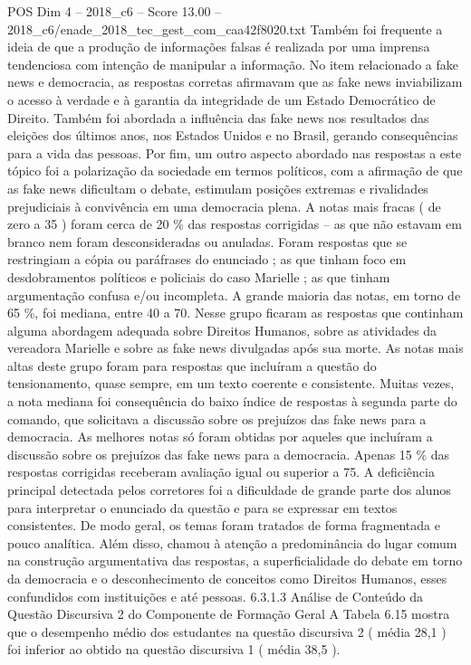 \begin{textsample}{POS Dim 4 – 2018\_c6 – Score 13.00 – 2018\_c6/enade\_2018\_tec\_gest\_com\_caa42f8020.txt}
Também foi frequente a ideia de que a produção de informações falsas é realizada por uma imprensa tendenciosa com intenção de manipular a informação.
No item relacionado a fake news e democracia, as respostas corretas afirmavam que as fake news inviabilizam o acesso à verdade e à garantia da integridade de um Estado Democrático de Direito.
Também foi abordada a influência das fake news nos resultados das eleições dos últimos anos, nos Estados Unidos e no Brasil, gerando consequências para a vida das pessoas.
Por fim, um outro aspecto abordado nas respostas a este tópico foi a polarização da sociedade em termos políticos, com a afirmação de que as fake news dificultam o debate, estimulam posições extremas e rivalidades prejudiciais à convivência em uma democracia plena.
A notas mais fracas ( de zero a 35 ) foram cerca de 20 \% das respostas corrigidas – as que não estavam em branco nem foram desconsideradas ou anuladas.
Foram respostas que se restringiam a cópia ou paráfrases do enunciado ; as que tinham foco em desdobramentos políticos e policiais do caso Marielle ; as que tinham argumentação confusa e/ou incompleta.
A grande maioria das notas, em torno de 65 \%, foi mediana, entre 40 a 70.
Nesse grupo ficaram as respostas que continham alguma abordagem adequada sobre Direitos Humanos, sobre as atividades da vereadora Marielle e sobre as fake news divulgadas após sua morte.
As notas mais altas deste grupo foram para respostas que incluíram a questão do tensionamento, quase sempre, em um texto coerente e consistente.
Muitas vezes, a nota mediana foi consequência do baixo índice de respostas à segunda parte do comando, que solicitava a discussão sobre os prejuízos das fake news para a democracia.
As melhores notas só foram obtidas por aqueles que incluíram a discussão sobre os prejuízos das fake news para a democracia.
Apenas 15 \% das respostas corrigidas receberam avaliação igual ou superior a 75.
A deficiência principal detectada pelos corretores foi a dificuldade de grande parte dos alunos para interpretar o enunciado da questão e para se expressar em textos consistentes.
De modo geral, os temas foram tratados de forma fragmentada e pouco analítica.
Além disso, chamou à atenção a predominância do lugar comum na construção argumentativa das respostas, a superficialidade do debate em torno da democracia e o desconhecimento de conceitos como Direitos Humanos, esses confundidos com instituições e até pessoas. 6.3.1.3 Análise de Conteúdo da Questão Discursiva 2 do Componente de Formação Geral A Tabela 6.15 mostra que o desempenho médio dos estudantes na questão discursiva 2 ( média 28,1 ) foi inferior ao obtido na questão discursiva 1 ( média 38,5 ).

\end{textsample}
